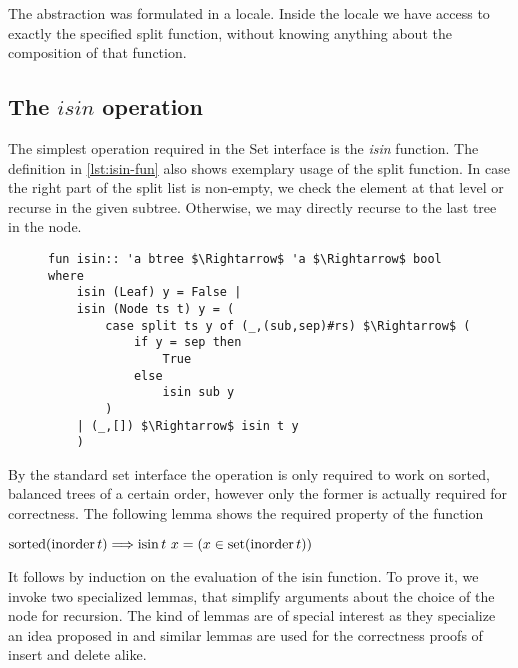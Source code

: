 The abstraction was formulated in a locale.
Inside the locale we have access to exactly the specified split function,
without knowing anything about the composition of that function.

\subsection{The $isin$ operation}

The simplest operation required in the Set interface is
the \textit{isin} function.
The definition in \autoref{lst:isin-fun} also shows exemplary usage of the split function.
In case the right part of the split list is non-empty,
we check the element at that level or recurse in the given subtree.
Otherwise, we may directly recurse to the last tree in the node.

\begin{figure}
\begin{lstlisting}[mathescape=true, language=Isabelle, caption=The \textit{isin} function, label=lst:isin-fun]
fun isin:: 'a btree $\Rightarrow$ 'a $\Rightarrow$ bool where
    isin (Leaf) y = False |
    isin (Node ts t) y = (
        case split ts y of (_,(sub,sep)#rs) $\Rightarrow$ (
            if y = sep then
                True
            else
                isin sub y
        )
    | (_,[]) $\Rightarrow$ isin t y
    )
\end{lstlisting}
\end{figure}

By the standard set interface the operation is only required to work on
sorted, balanced trees of a certain order, however only the former is actually required
for correctness.
The following lemma shows the required property of the function

\begin{theorem}
    \label{thm:isin-set}
    $\operatorname{sorted} (\operatorname{inorder} t) \Longrightarrow \operatorname{isin} t\ x = (x \in \operatorname{set} (\operatorname{inorder} t))$
\end{theorem}

It follows by induction on the evaluation of the isin function.
To prove it, we invoke two specialized lemmas,
that simplify arguments about the choice of the node for recursion.
The kind of lemmas are of special interest as they specialize
an idea proposed in \parencite{DBLP:conf/itp/Nipkow16} and similar lemmas
are used for the correctness proofs of insert and delete alike.

